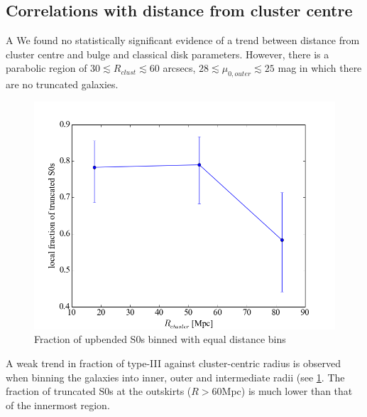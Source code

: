 \subsection{Correlations with distance from cluster centre} %
\label{sub:correlations}
A 
We found no statistically significant evidence of a trend between distance from cluster centre and bulge and classical disk parameters. However, there is a parabolic region of $30 \lesssim R_{clust} \lesssim 60$ arcsecs, $28 \lesssim \mu_{0,outer} \lesssim 25$ mag in which there are no truncated galaxies.
\begin{figure}[h]
	\centering
	\includegraphics[scale=0.5]{figs/fraction_vs_cluster_radius}
	\caption{Fraction of upbended S0s binned with equal distance bins}
	\label{fraction vs dist}
\end{figure}

A weak trend in fraction of type-III against cluster-centric radius is observed when binning the galaxies into inner, outer and intermediate radii (see \ref{fraction vs dist}. The fraction of truncated S0s at the outskirts ($R > 60 $Mpc) is much lower than that of the innermost region.

